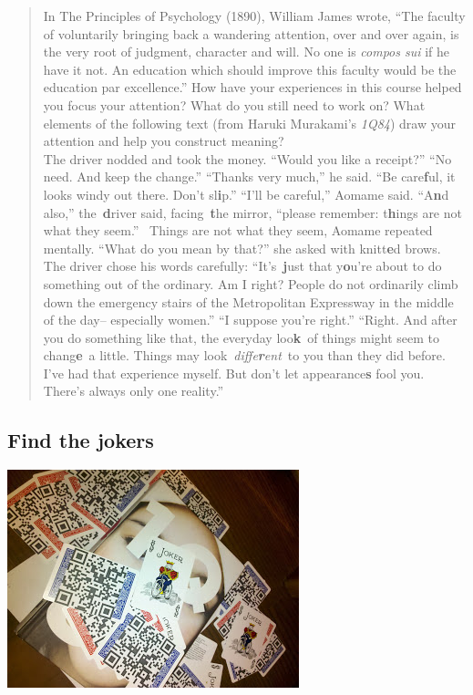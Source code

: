 \begin{quote}
In The Principles of Psychology (1890), William James wrote, ``The
faculty of voluntarily bringing back a wandering attention, over and
over again, is the very root of judgment, character and will. No one is
\emph{compos sui} if he have it not. An education which should improve
this faculty would be the education par excellence.'' How have your
experiences in this course helped you focus your attention? What do you
still need to work on? What elements of the following text (from Haruki
Murakami's \emph{1Q84}) draw your attention and help you construct
meaning? \\[.5cm] The driver nodded and took the money. ``Would you like a
receipt?'' ``No need. And keep the change.'' ``Thanks very much,'' he
said. ``Be care\textbf{f}ul, it looks windy out there. Don't
sl\textbf{i}p.'' ``I'll be careful,'' Aomame said. ``A\textbf{n}d
also,'' the~\textbf{d}river said, facing~\textbf{t}he mirror, ``please
remember: t\textbf{h}ings are not what they seem.''~ Things are not what
they seem, Aomame repeated mentally. ``What do you mean by that?'' she
asked with knitt\textbf{e}d brows. The driver chose his words carefully:
``It's~\textbf{j}ust that y\textbf{o}u're about to do something out of
the ordinary. Am I right? People do not ordinarily climb down the
emergency stairs of the Metropolitan Expressway in the middle of the
day-- especially women.'' ``I suppose you're right.'' ``Right. And after
you do something like that, the everyday loo\textbf{k}~of things might
seem to chang\textbf{e}~a little. Things may
look~\emph{diffe\textbf{r}ent}~to you than they did before. I've had
that experience myself. But don't let appearance\textbf{s} fool you.
There's always only one reality.''
\end{quote}

\subsection{Find the jokers}

{\centering
\includegraphics[width=.9\textwidth]{../pictures/jokers.jpg}\par}


